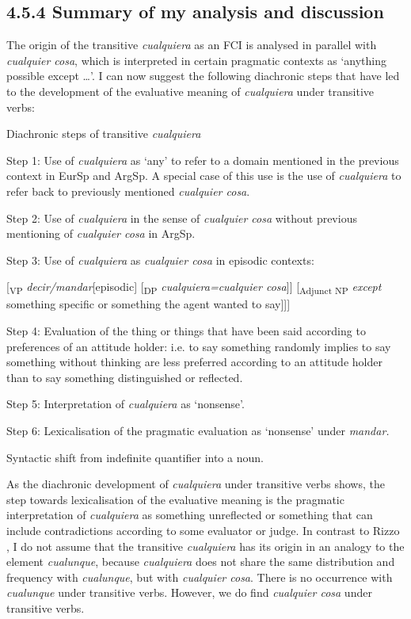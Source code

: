 \subsection{\textbf{4.5.4} \textbf{Summary} \textbf{of} \textbf{my} \textbf{analysis} \textbf{and} \textbf{discussion}}

The origin of the transitive \textit{cualquiera} as an FCI is analysed in parallel with \textit{cualquier cosa}, which is interpreted in certain pragmatic contexts as ‘anything possible except …’. I can now suggest the following diachronic steps that have led to the development of the evaluative meaning of \textit{cualquiera} under transitive verbs:

  Diachronic steps of transitive \textit{cualquiera}

  Step 1:   Use of \textit{cualquiera} as ‘any’ to refer to a domain mentioned in the previous context in EurSp and ArgSp. A special case of this use is the use of \textit{cualquiera} to refer back to previously mentioned \textit{cualquier cosa}.

  Step 2:  Use of \textit{cualquiera} in the sense of \textit{cualquier cosa} without previous mentioning of \textit{cualquier cosa} in ArgSp.

  Step 3:  Use of \textit{cualquiera} as \textit{cualquier cosa} in episodic contexts: 

[\textsubscript{VP} \textit{decir/mandar}[episodic] [\textsubscript{DP} \textit{cualquiera=cualquier cosa}]] [\textsubscript{Adjunct NP} \textit{except} something specific or something the agent wanted to say]]]

  Step 4:  Evaluation of the thing or things that have been said according to preferences of an attitude holder: i.e. to say something randomly implies to say something without thinking are less preferred according to an attitude holder than to say something distinguished or reflected.

  Step 5:  Interpretation of \textit{cualquiera} as ‘nonsense’. 

  Step 6:  Lexicalisation of the pragmatic evaluation as ‘nonsense’ under \textit{mandar.} 

Syntactic shift from indefinite quantifier into a noun.

As the diachronic development of \textit{cualquiera} under transitive verbs shows, the step towards lexicalisation of the evaluative meaning is the pragmatic interpretation of \textit{cualquiera} as something unreflected or something that can include contradictions according to some evaluator or judge. In contrast to Rizzo \citet{Salierno2013}, I do not assume that the transitive \textit{cualquiera} has its origin in an analogy to the element \textit{cualunque}, because \textit{cualquiera} does not share the same distribution and frequency with \textit{cualunque}, but with \textit{cualquier cosa}. There is no occurrence with \textit{cualunque} under transitive verbs. However, we do find \textit{cualquier cosa} under transitive verbs.

